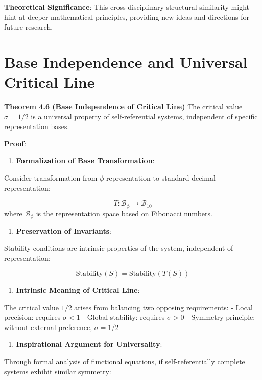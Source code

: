 \textbf{Theoretical Significance}:
This cross-disciplinary structural similarity might hint at deeper mathematical principles, providing new ideas and directions for future research.

\section{Base Independence and Universal Critical Line}
\label{sec:ch04_riemann:base-independence-and-universal-critical-line}

\textbf{Theorem 4.6 (Base Independence of Critical Line)}
\label{thm:4.6}
The critical value $\sigma = 1/2$ is a universal property of self-referential systems, independent of specific representation bases.

\textbf{Proof}:

\begin{enumerate}
\item \textbf{Formalization of Base Transformation}:
\end{enumerate}
   Consider transformation from $\phi$-representation to standard decimal representation:
   
\begin{equation}
T: \mathcal{B}_\phi \to \mathcal{B}_{10}
\end{equation}
   where $\mathcal{B}_\phi$ is the representation space based on Fibonacci numbers.
   
\begin{enumerate}
\item \textbf{Preservation of Invariants}:
\end{enumerate}
   Stability conditions are intrinsic properties of the system, independent of representation:
   
\begin{equation}
\text{Stability}(S) = \text{Stability}(T(S))
\end{equation}

\begin{enumerate}
\item \textbf{Intrinsic Meaning of Critical Line}:
\end{enumerate}
   The critical value $1/2$ arises from balancing two opposing requirements:
   - Local precision: requires $\sigma < 1$
   - Global stability: requires $\sigma > 0$
   - Symmetry principle: without external preference, $\sigma = 1/2$
   
\begin{enumerate}
\item \textbf{Inspirational Argument for Universality}:
\end{enumerate}
   Through formal analysis of functional equations, if self-referentially complete systems exhibit similar symmetry:
   
